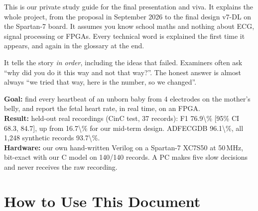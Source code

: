 \documentclass[11pt]{article}
\begin{document}

\begin{simple}
This is our private study guide for the final presentation and viva. It explains the whole project, from the proposal in September 2026 to the final design v7-DL on the Spartan-7 board. It assumes you know school maths and nothing about ECG, signal processing or FPGAs. Every technical word is explained the first time it appears, and again in the glossary at the end.

It tells the story \emph{in order}, including the ideas that failed. Examiners often ask ``why did you do it this way and not that way?''. The honest answer is almost always ``we tried that way, here is the number, so we changed''.
\end{simple}

\begin{keyfact}
\textbf{Goal:} find every heartbeat of an unborn baby from 4 electrodes on the mother's belly, and report the fetal heart rate, in real time, on an FPGA.\\
\textbf{Result:} held-out real recordings (CinC test, 37 records): F1 \num{76.9\%} [95\% CI 68.3, 84.7], up from \num{16.7\%} for our mid-term design. ADFECGDB \num{96.1\%}, all 1,248 synthetic records \num{93.7\%}.\\
\textbf{Hardware:} our own hand-written Verilog on a Spartan-7 XC7S50 at 50\,MHz, bit-exact with our C model on 140/140 records. A PC makes five slow decisions and never receives the raw recording.
\end{keyfact}

\newpage
\tableofcontents
\newpage

\section{How to Use This Document}
\label{sec:howto}
\end{document}
